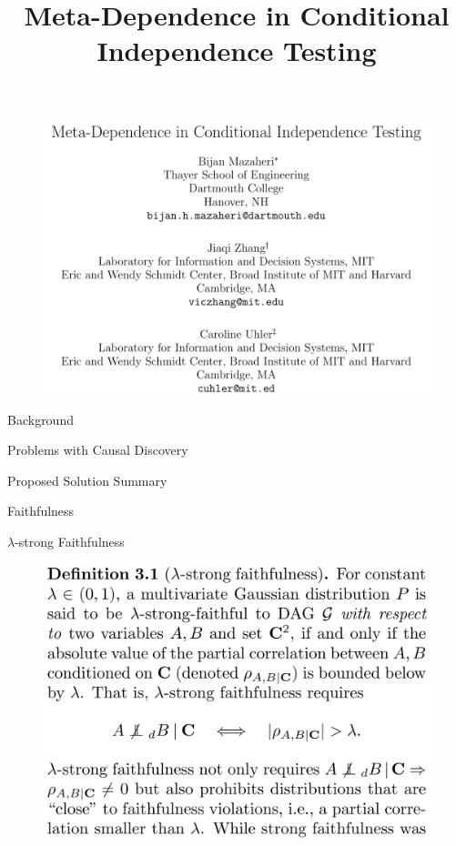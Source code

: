 \documentclass{beamer}
\begin{document}
\title[]{Meta-Dependence in Conditional Independence Testing}
\date{}

\begin{frame}
	\begin{figure}
		\includegraphics[scale=0.15]{imgs/title.png}
	\end{figure}
\end{frame}

\begin{frame}{Background}
\end{frame}

\begin{frame}{Problems with Causal Discovery}

\end{frame}

\begin{frame}{Proposed Solution Summary}
\end{frame}

\begin{frame}{Faithfulness}
\end{frame}

\begin{frame}{$\lambda$-strong Faithfulness}
	\begin{figure}
		\includegraphics[scale=0.15]{imgs/def31.png}
	\end{figure}
\end{frame}
\end{document}
